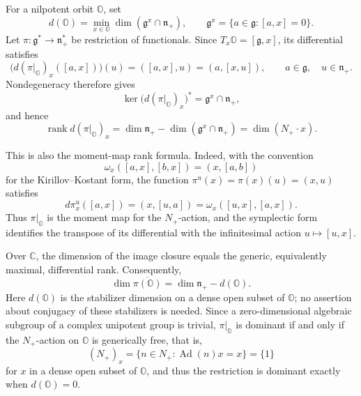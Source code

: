 \documentclass[11pt]{amsart}
\theoremstyle{definition}
\theoremstyle{remark}
\begin{document}
For a nilpotent orbit $\mathbb O$, set
\[
 d(\mathbb O)
 =\min_{x\in\mathbb O}\dim(\mathfrak g^x\cap\mathfrak n_+),
 \qquad
 \mathfrak g^x=\{a\in\mathfrak g:[a,x]=0\}.
\]
Let $\pi:\mathfrak g^*\to\mathfrak n_+^*$ be restriction of functionals.
Since $T_x\mathbb O=[\mathfrak g,x]$, its differential satisfies
\[
 \bigl(d(\pi|_{\mathbb O})_x([a,x])\bigr)(u)
 =([a,x],u)=(a,[x,u]),
 \qquad a\in\mathfrak g,\quad u\in\mathfrak n_+.
\]
Nondegeneracy therefore gives
\[
 \ker\bigl(d(\pi|_{\mathbb O})_x\bigr)^*
 =\mathfrak g^x\cap\mathfrak n_+,
\]
and hence
\begin{equation}\label{eq:moment-rank}
 \operatorname{rank}d(\pi|_{\mathbb O})_x
 =\dim\mathfrak n_+-\dim(\mathfrak g^x\cap\mathfrak n_+)
 =\dim(N_+\cdot x).
\end{equation}

This is also the moment-map rank formula. Indeed, with the convention
\[
 \omega_x([a,x],[b,x])=(x,[a,b])
\]
for the Kirillov--Kostant form, the function
$\pi^u(x)=\pi(x)(u)=(x,u)$ satisfies
\[
 d\pi^u_x([a,x])
 =(x,[u,a])
 =\omega_x([u,x],[a,x]).
\]
Thus $\pi|_{\mathbb O}$ is the moment map for the $N_+$-action,
and the symplectic form identifies the transpose of its differential
with the infinitesimal action $u\mapsto[u,x]$.

Over $\mathbb C$, the dimension of the image closure equals the generic,
equivalently maximal, differential rank. Consequently,
\begin{equation}\label{eq:projection-dimension}
 \dim\overline{\pi(\mathbb O)}
 =\dim\mathfrak n_+-d(\mathbb O).
\end{equation}
Here $d(\mathbb O)$ is the stabilizer dimension on a dense open subset
of $\mathbb O$; no assertion about conjugacy of these stabilizers is
needed. Since a zero-dimensional algebraic subgroup of a complex
unipotent group is trivial, $\pi|_{\mathbb O}$ is dominant if and only if
the $N_+$-action on $\mathbb O$ is generically free, that is,
\[
 (N_+)_x
 =\{n\in N_+:\operatorname{Ad}(n)x=x\}
 =\{1\}
\]
for $x$ in a dense open subset of $\mathbb O$, and thus the restriction is
dominant exactly when $d(\mathbb O)=0$.


\end{document}
